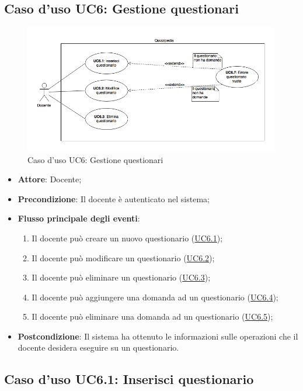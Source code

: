 \documentclass[12pt,a4paper]{article}
\begin{document}
\subsection{Caso d'uso UC6: Gestione questionari}
\begin{figure}[H]
	\centering
	\includegraphics[width=\textwidth]{../img/diagramUC6.png}
	\caption{Caso d'uso UC6: Gestione questionari}\label{fig:UC6} 
\end{figure}
\begin{itemize}

\item \textbf{Attore}: Docente; 
\item \textbf{Precondizione}: Il docente è autenticato nel sistema;

\item \textbf{Flusso principale degli eventi}:
\begin{enumerate}
	\item Il docente può creare un nuovo questionario (\hyperlink{UC6.1}{UC6.1});
	\item Il docente può modificare un questionario (\hyperlink{UC6.2}{UC6.2});
	\item Il docente può eliminare un questionario (\hyperlink{UC6.3}{UC6.3});
	\item Il docente può aggiungere una domanda ad un questionario (\hyperlink{UC6.4}{UC6.4});
	\item Il docente può eliminare una domanda ad un questionario (\hyperlink{UC6.5}{UC6.5});
	
\end{enumerate}
\item \textbf{Postcondizione}: Il sistema ha ottenuto le informazioni sulle operazioni che
il docente desidera eseguire su un questionario.
\end{itemize}
\hypertarget{UC6.1}{}
\subsection{Caso d'uso UC6.1: Inserisci questionario}
\end{document}
